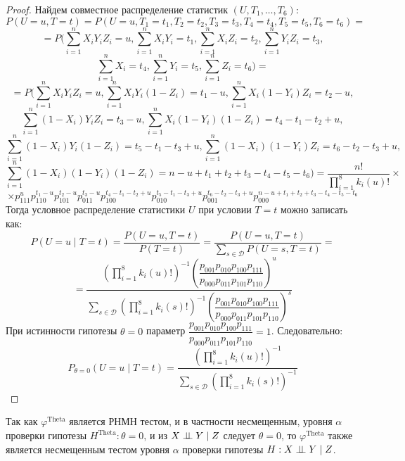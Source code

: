     \begin{proof}
        Найдем совместное распределение статистик $(U,T_1,\ldots,T_6)$:
        $$
            P(U=u,T=t)=P(U=u, T_1=t_1, T_2=t_2, T_3=t_3, T_4=t_4, T_5=t_5, T_6=t_6)=
        $$
        $$
            =P\biggl(\sum_{i=1}^n X_i Y_i Z_i=u, \sum_{i=1}^n X_i Y_i=t_1, \sum_{i=1}^n X_i Z_i=t_2,\sum_{i=1}^n Y_i Z_i=t_3,
            $$
            $$
            \sum_{i=1}^n X_i=t_4,\sum_{i=1}^n Y_i=t_5, \sum_{i=1}^n Z_i=t_6\biggr)=
        $$
        $$
            =P\biggl(\sum_{i=1}^n X_i Y_i Z_i=u, \sum_{i=1}^n X_i Y_i (1- Z_i)=t_1-u, \sum_{i=1}^n X_i (1-Y_i) Z_i=t_2-u,
        $$
        $$
            \sum_{i=1}^n (1-X_i) Y_i Z_i=t_3-u,
            \sum_{i=1}^{n} X_i(1-Y_i)(1-Z_i)=t_4-t_1-t_2+u,
        $$
        $$
            \sum_{i=1}^{n} (1-X_i)Y_i(1-Z_i)=t_5-t_1-t_3+u,
            \sum_{i=1}^{n} (1-X_i)(1-Y_i)Z_i = t_6 - t_2 - t_3 + u,
        $$
        $$
            \sum_{i=1}^n (1-X_i)(1-Y_i)(1-Z_i)=n-u+t_1+t_2+t_3-t_4-t_5-t_6\biggr)
            = \frac{n!}{\prod_{i=1}^8 k_i(u)!} \times
        $$
        $$    
        \times p_{111}^u p_{110}^{t_1-u} p_{101}^{t_2-u} p_{011}^{t_3-u}
            p_{100}^{t_4-t_1-t_2+u} p_{010}^{t_5-t_1-t_3+u} p_{001}^{t_6 - t_2 - t_3 + u} 
            p_{000}^{n-u+t_1+t_2+t_3-t_4-t_5-t_6}
            $$
        Тогда условное распределение статистики $U$ при условии $T=t$ можно записать как:
        $$P(U=u \mid T=t)=\dfrac{P(U=u,T=t)}{P(T=t)}=
        \dfrac{P(U=u,T=t)}{\sum_{s \in \mathcal{D}} P(U=s,T=t)}=
        $$
        $$
        =\dfrac{(\prod_{i=1}^8 k_i(u)!)^{-1} \left(\dfrac{p_{001}p_{010}p_{100}p_{111}}{p_{000}p_{011}p_{101}p_{110}}\right)^u}
            {\sum_{s\in \mathcal{D}} (\prod_{i=1}^8 k_i(s)!)^{-1} \left(\dfrac{p_{001}p_{010}p_{100}p_{111}}{p_{000}p_{011}p_{101}p_{110}}\right)^s}$$
        При истинности гипотезы $\theta=0$ параметр $\dfrac{p_{001}p_{010}p_{100}p_{111}}{p_{000}p_{011}p_{101}p_{110}}=1$. Следовательно:
        $$P_{\theta=0}(U=u \mid T=t)=\dfrac{(\prod_{i=1}^8 k_i(u)!)^{-1}}
            {\sum_{s\in \mathcal{D}} (\prod_{i=1}^8 k_i(s)!)^{-1}}$$
    \end{proof}
    Так как $\varphi^{\text{Theta}}$ является РНМН тестом, и
    в частности несмещенным, уровня
    $\alpha$ проверки гипотезы $H^{\text{Theta}}: \theta=0$,
    и из $X \perp\!\!\!\perp Y \mid Z$ следует $\theta=0$, то 
    $\varphi^{\text{Theta}}$ также является несмещенным тестом уровня $\alpha$ проверки
    гипотезы $H: X \perp\!\!\!\perp Y \mid Z$.
